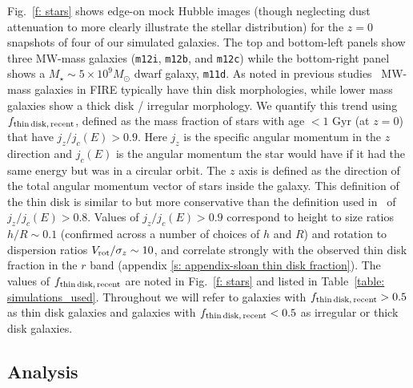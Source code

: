 \documentclass[fleqn,usenatbib]{mnras}
\newcommand{\fthin}{f_{\rm thin\,disk,\,recent}}
\begin{document}
Fig.~\ref{f: stars} shows edge-on mock Hubble images (though neglecting dust attenuation to more clearly illustrate the stellar distribution) for the $z=0$ snapshots of four of our simulated galaxies.
The top and bottom-left panels show three MW-mass galaxies (\texttt{m12i}, \texttt{m12b}, and \texttt{m12c}) while the bottom-right panel shows a $M_\star \sim 5 \times 10^9 M_\odot$ dwarf galaxy, \texttt{m11d}.
As noted in previous studies~\citep{Garrison-Kimmel2018, El-Badry2018} MW-mass galaxies in FIRE typically have thin disk morphologies, while lower mass galaxies show a thick disk / irregular morphology.
We quantify this trend using $\fthin$, defined as the mass fraction of stars with age $<1$ Gyr (at $z=0$) that have $j_z/j_c(E) > 0.9$.
Here $j_z$ is the specific angular momentum in the $z$ direction and $j_c(E)$ is the angular momentum the star would have if it had the same energy but was in a circular orbit.
The $z$ axis is defined as the direction of the total angular momentum vector of stars inside the galaxy.
This definition of the thin disk is similar to but more conservative than the definition used in~\cite{Yu2021} of $j_z/j_c(E) > 0.8$.
Values of $j_z/j_c(E)>0.9$ correspond to height to size ratios $h/R \sim 0.1$ (confirmed across a number of choices of $h$ and $R$) and rotation to dispersion ratios $V_{\rm rot}/\sigma_z \sim10$, and correlate strongly with the observed thin disk fraction in the $r$ band (appendix \ref{s: appendix-sloan thin disk fraction}).
The values of $\fthin$ are noted in Fig.~\ref{f: stars} and listed in Table~\ref{table: simulations_used}.
Throughout we will refer to galaxies with $\fthin > 0.5$ as thin disk galaxies and galaxies with $\fthin < 0.5$ as irregular or thick disk galaxies.

\subsection{Analysis}
\label{s: methods -- analysis}
\end{document}
